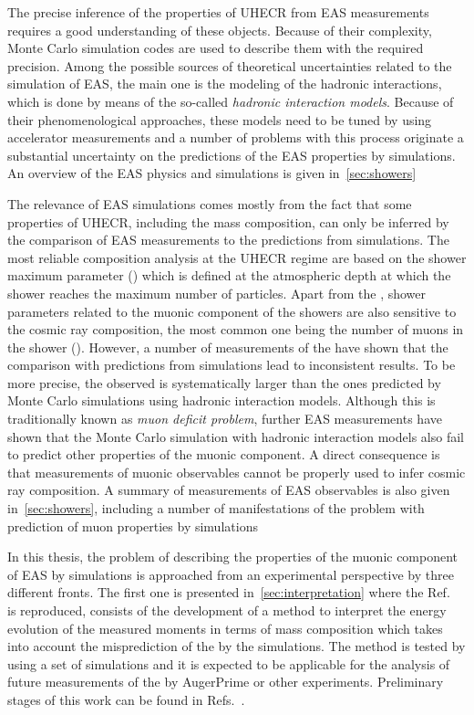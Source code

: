 The precise inference of the properties of UHECR
from EAS measurements requires a good understanding
of these objects. Because of their complexity,
Monte Carlo simulation codes are used to describe them
with the required precision. Among the possible sources
of theoretical uncertainties related to the
simulation of EAS, the main one is the modeling
of the hadronic interactions, which is done
by means of the so-called \emph{hadronic interaction models}. 
Because of their phenomenological approaches,
these models need to be tuned by using accelerator measurements
and a number of problems with this process originate a substantial
uncertainty on the predictions of the EAS properties by simulations.
An overview of the EAS physics and simulations is given
in~\cref{sec:showers}

The relevance of EAS simulations comes mostly from the fact that
some properties of UHECR, including the mass composition,
can only be inferred by the comparison of EAS measurements
to the predictions from simulations.
The most reliable composition analysis at the UHECR regime
are based on the shower maximum parameter (\xmax) which is defined
at the atmospheric depth at which the shower reaches the maximum
number of particles. Apart from the \xmax, shower parameters related
to the muonic component of the showers are also sensitive to
the cosmic ray composition, the most common one being the number
of muons in the shower (\nmu). However, a number of measurements of the \nmu
have shown that the comparison with predictions from simulations lead
to inconsistent results. To be more precise, the \nmu observed is systematically
larger than the ones predicted by Monte Carlo simulations using hadronic interaction
models. Although this is traditionally known as \emph{muon deficit problem},
further EAS measurements have shown
that the Monte Carlo simulation with hadronic interaction models
also fail to predict other properties of the muonic component.
A direct consequence is that measurements of muonic observables cannot be
properly used to infer cosmic ray composition.  
A summary of measurements of EAS observables is also given in~\cref{sec:showers},
including a number of manifestations of the problem with prediction of muon properties by simulations


In this thesis, the problem of describing the properties of the muonic component of EAS
by simulations is approached from an experimental perspective by three different fronts.
The first one is presented in~\cref{sec:interpretation}
where the Ref.~\cite{Prado:2016akv} is reproduced,
consists of the development of a method to interpret the energy evolution
of the measured \nmu moments in terms of mass composition which takes into account
the misprediction of the \nmu by the simulations. The method is tested by using
a set of simulations and it is expected to be applicable for the analysis
of future measurements of the \nmu by AugerPrime or other experiments.
Preliminary stages of this work can be found in Refs.~\cite{}.


